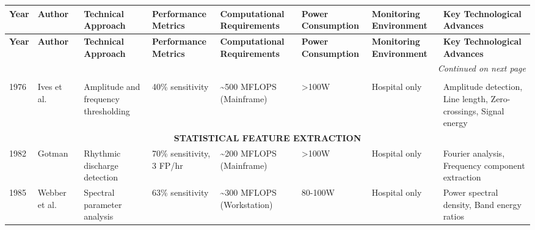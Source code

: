 \documentclass[pdflatex,sn-mathphys-num]{sn-jnl}%
\theoremstyle{thmstyleone}%
\theoremstyle{thmstyletwo}%
\theoremstyle{thmstylethree}%
\begin{document}

\begin{landscape}
\begin{longtable}{|p{1.2cm}|p{1.5cm}|p{2.5cm}|p{2.3cm}|p{2.5cm}|p{1.8cm}|p{2.2cm}|p{3cm}|}
\hline
\textbf{Year} & \textbf{Author} & \textbf{Technical Approach} & \textbf{Performance Metrics} & \textbf{Computational Requirements} & \textbf{Power Consumption} & \textbf{Monitoring Environment} & \textbf{Key Technological Advances} \\
\hline
\endfirsthead
\hline
\textbf{Year} & \textbf{Author} & \textbf{Technical Approach} & \textbf{Performance Metrics} & \textbf{Computational Requirements} & \textbf{Power Consumption} & \textbf{Monitoring Environment} & \textbf{Key Technological Advances} \\
\hline
\endhead
\hline
\multicolumn{8}{r}{\textit{Continued on next page}} \\
\hline
\endfoot
\hline
\endlastfoot

\multicolumn{8}{|c|}{\textbf{THRESHOLDING APPROACHES}} \\
\hline
1976 & Ives et al.~\cite{ives1976} & Amplitude and frequency thresholding & 40\% sensitivity & \textasciitilde500 MFLOPS (Mainframe) & >100W & Hospital only & Amplitude detection, Line length, Zero-crossings, Signal energy \\
\hline

\multicolumn{8}{|c|}{\textbf{STATISTICAL FEATURE EXTRACTION}} \\
\hline
1982 & Gotman~\cite{Gotman1982} & Rhythmic discharge detection & 70\% sensitivity, 3 FP/hr & \textasciitilde200 MFLOPS (Mainframe) & >100W & Hospital only & Fourier analysis, Frequency component extraction \\
\hline
1985 & Webber et al.~\cite{webber1985} & Spectral parameter analysis & 63\% sensitivity & \textasciitilde300 MFLOPS (Workstation) & 80-100W & Hospital only & Power spectral density, Band energy ratios \\
\hline


\end{longtable}
\end{landscape}
\end{document}
